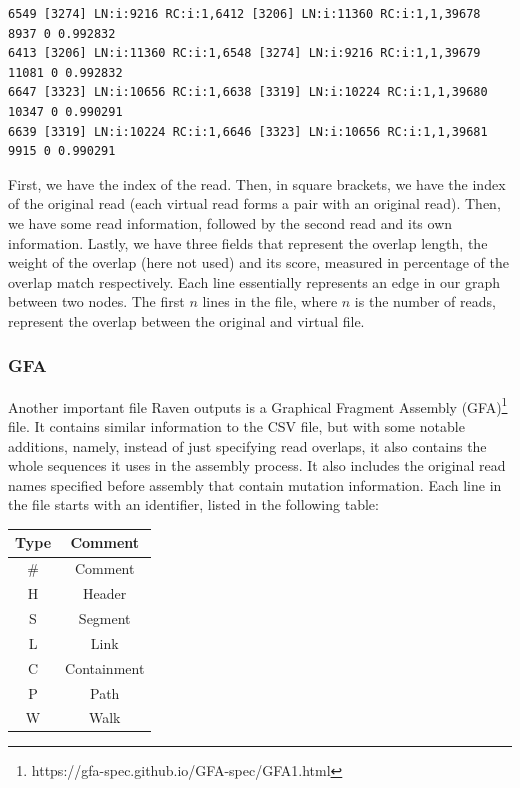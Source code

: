 \documentclass[times, utf8, diplomski, english]{fer_eng}
\begin{document}
\begin{lstlisting}
6549 [3274] LN:i:9216 RC:i:1,6412 [3206] LN:i:11360 RC:i:1,1,39678 8937 0 0.992832
6413 [3206] LN:i:11360 RC:i:1,6548 [3274] LN:i:9216 RC:i:1,1,39679 11081 0 0.992832
6647 [3323] LN:i:10656 RC:i:1,6638 [3319] LN:i:10224 RC:i:1,1,39680 10347 0 0.990291
6639 [3319] LN:i:10224 RC:i:1,6646 [3323] LN:i:10656 RC:i:1,1,39681 9915 0 0.990291
\end{lstlisting}

First, we have the index of the read. Then, in square brackets, we have the index of the original read (each virtual read forms a pair with an original read). Then, we have some read information, followed by the second read and its own information. Lastly, we have three fields that represent the overlap length, the weight of the overlap (here not used) and its score, measured in percentage of the overlap match respectively. Each line essentially represents an edge in our graph between two nodes. The first $n$ lines in the file, where $n$ is the number of reads, represent the overlap between the original and virtual file.

\subsubsection{GFA}

Another important file Raven outputs is a Graphical Fragment Assembly (GFA)\footnote{https://gfa-spec.github.io/GFA-spec/GFA1.html} file. It contains similar information to the CSV file, but with some notable additions, namely, instead of just specifying read overlaps, it also contains the whole sequences it uses in the assembly process. It also includes the original read names specified before assembly that contain mutation information. Each line in the file starts with an identifier, listed in the following table:

\begin{center}
	\begin{tabular}{ |c|c| }
		\hline
		\textbf{Type} & \textbf{Comment} \\
		\hline
		\# & Comment \\
		\hline
		H & Header \\
		\hline
		S & Segment \\
		\hline
		L & Link \\
		\hline
		C & Containment \\
		\hline
		P & Path \\
		\hline
		W & Walk \\
		\hline
	\end{tabular}
\end{center}
\end{document}
